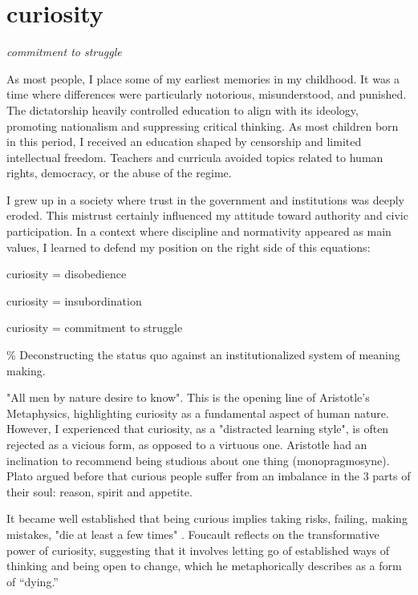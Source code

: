 \chapter*{curiosity}
\begin{center}
\vspace{2cm}
\begin{flushright}
\large
\textit{commitment to struggle}
\end{flushright}
\vspace*{\fill}
\end{center}
\normalsize

As most people, I place some of my earliest memories in my childhood. It was a time where differences were particularly notorious, misunderstood, and punished. The dictatorship heavily controlled education to align with its ideology, promoting nationalism and suppressing critical thinking. As most children born in this period, I received an education shaped by censorship and limited intellectual freedom. Teachers and curricula avoided topics related to human rights, democracy, or the abuse of the regime. 

I grew up in a society where trust in the government and institutions was deeply eroded. This mistrust certainly influenced my attitude toward authority and civic participation. In a context where discipline and normativity appeared as main values, I learned to defend my position on the right side of this equations: 

curiosity = disobedience

curiosity = insubordination

curiosity = commitment to struggle 

{\scriptsize \textcolor{comment}{\%  Deconstructing the status quo against an institutionalized system of meaning making.}}

"All men by nature desire to know". This is the opening line of Aristotle's Metaphysics, highlighting curiosity as a fundamental aspect of human nature.  However, I experienced that curiosity, as a "distracted learning style", is often rejected as a vicious form, as opposed to a virtuous one. Aristotle had an inclination to recommend being studious about one thing (monopragmosyne). Plato argued before that curious people suffer from an imbalance in the 3 parts of their soul: reason, spirit and appetite. \citep{perry2020}

It became well established that being curious implies taking risks, failing, making mistakes, "die at least a few times" \citep{foucault1980masked}. Foucault reflects on the transformative power of curiosity, suggesting that it involves letting go of established ways of thinking and being open to change, which he metaphorically describes as a form of “dying.”

